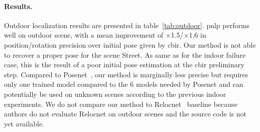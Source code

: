 
\paragraph{Results.} Outdoor localization results are presented in table~\ref{tab:outdoor}. \ac{pnlp} performs well on outdoor scene, with a mean improvement of $\times$1.5/$\times$1.6 in position/rotation precision over initial pose given by \ac{cbir}. Our method is not able to recover a proper pose for the scene Street. As same as for the indoor failure case, this is the result of a poor initial pose estimation at the \ac{cbir} preliminary step. Compared to Posenet~\citep{Kendall2017}, our method is marginally less precise but requires only one trained model compared to the 6 models needed by Posenet and can potentially be used on unknown scenes according to the previous indoor experiments. We do not compare our method to Relocnet~\citep{Purkait2018} baseline because authors do not evaluate Relocnet on outdoor scenes and the source code is not yet available.

